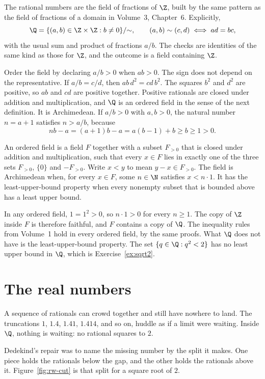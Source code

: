 The rational numbers are the field of fractions of $\Z$, built by the same pattern as the field of fractions of a domain in Volume~3, Chapter~6. Explicitly,
\[
\Q=\{(a,b)\in\Z\times\Z:b\ne 0\}/{\sim},\qquad (a,b)\sim(c,d)\iff ad=bc,
\]
with the usual sum and product of fractions $a/b$. The checks are identities of the same kind as those for $\Z$, and the outcome is a field containing $\Z$.

Order the field by declaring $a/b>0$ when $ab>0$. The sign does not depend on the representative. If $a/b=c/d$, then $ab\,d^2=cd\,b^2$. The squares $b^2$ and $d^2$ are positive, so $ab$ and $cd$ are positive together. Positive rationals are closed under addition and multiplication, and $\Q$ is an ordered field in the sense of the next definition. It is Archimedean. If $a/b>0$ with $a,b>0$, the natural number $n=a+1$ satisfies $n>a/b$, because
\[
nb-a=(a+1)b-a=a(b-1)+b\ge b\ge 1>0.
\]

\begin{definition}
An ordered field is a field $F$ together with a subset $F_{>0}$ that is closed under addition and multiplication, such that every $x\in F$ lies in exactly one of the three sets $F_{>0}$, $\{0\}$ and $-F_{>0}$. Write $x<y$ to mean $y-x\in F_{>0}$. The field is Archimedean when, for every $x\in F$, some $n\in\N$ satisfies $x<n\cdot 1$. It has the least-upper-bound property when every nonempty subset that is bounded above has a least upper bound.
\end{definition}

In any ordered field, $1=1^2>0$, so $n\cdot 1>0$ for every $n\ge 1$. The copy of $\Z$ inside $F$ is therefore faithful, and $F$ contains a copy of $\Q$. The inequality rules from Volume~1 hold in every ordered field, by the same proofs. What $\Q$ does not have is the least-upper-bound property. The set $\{q\in\Q:q^2<2\}$ has no least upper bound in $\Q$, which is Exercise~\ref{ex:sqrt2}.

\section{The real numbers}\label{sec:reals}

A sequence of rationals can crowd together and still have nowhere to land. The truncations $1$, $1.4$, $1.41$, $1.414$, and so on, huddle as if a limit were waiting. Inside $\Q$, nothing is waiting: no rational squares to $2$.

Dedekind's repair was to name the missing number by the split it makes. One piece holds the rationals below the gap, and the other holds the rationals above it. Figure~\ref{fig:rw-cut} is that split for a square root of $2$.

